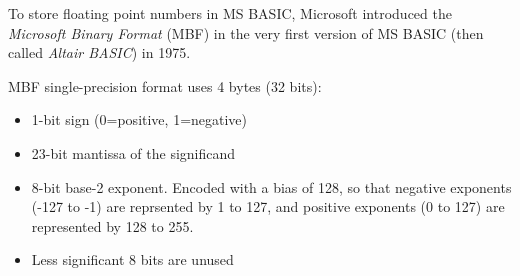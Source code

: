     To store floating point numbers in MS BASIC, Microsoft introduced the
    \textit{Microsoft Binary Format} (MBF) in the very first version of MS BASIC
    (then called \textit{Altair BASIC}) in 1975.

    MBF single-precision format uses 4 bytes (32 bits):
    
    \begin{itemize}
        \item 1-bit sign (0=positive, 1=negative)
        \item 23-bit mantissa of the significand
        \item 8-bit base-2 exponent. Encoded with a bias of 128, so that
            negative exponents (-127 to -1) are reprsented by 1 to 127, and
            positive exponents (0 to 127) are represented by 128 to 255.
        \item Less significant 8 bits are unused
    \end{itemize}
